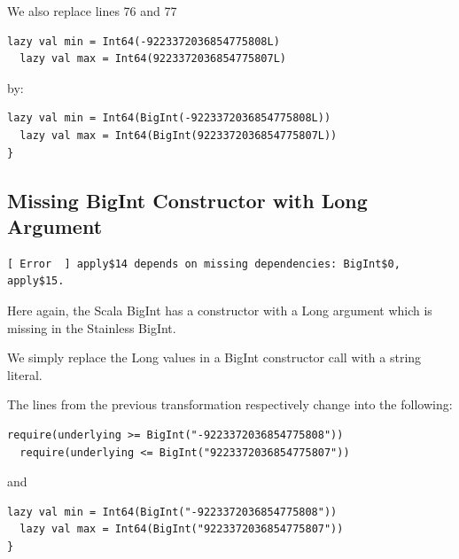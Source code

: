 \documentclass[runningheads]{llncs}
\begin{document}
We also replace lines 76 and 77
\begin{lstlisting}[style=scala]
  lazy val min = Int64(-9223372036854775808L)
  lazy val max = Int64(9223372036854775807L)
\end{lstlisting}

by:
\begin{lstlisting}[style=scala]
  lazy val min = Int64(BigInt(-9223372036854775808L))
  lazy val max = Int64(BigInt(9223372036854775807L))
}
\end{lstlisting}


\subsection{Missing BigInt Constructor with Long Argument}

\begin{lstlisting}[style=stainless]
[ Error  ] apply$14 depends on missing dependencies: BigInt$0, apply$15.
\end{lstlisting}

Here again, the Scala BigInt has a constructor with a Long argument
which is missing in the Stainless BigInt.

We simply replace the Long values in a BigInt constructor call with a string
literal.

The lines from the previous transformation respectively change into
the following:

\begin{lstlisting}[style=scala]
  require(underlying >= BigInt("-9223372036854775808"))
  require(underlying <= BigInt("9223372036854775807"))
\end{lstlisting}

and

\begin{lstlisting}[style=scala]
  lazy val min = Int64(BigInt("-9223372036854775808"))
  lazy val max = Int64(BigInt("9223372036854775807"))
}
\end{lstlisting}
\end{document}
